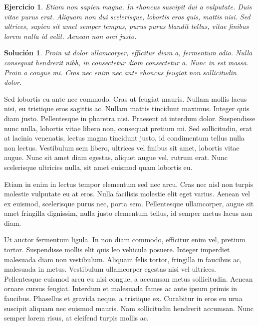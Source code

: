 \documentclass[10pt, a4paper]{article}
\theoremstyle{theorem-style}
\theoremstyle{definition-style}
\theoremstyle{remark-style}
\theoremstyle{example-style}
\theoremstyle{definition-style}
\newtheorem{ejer}{Ejercicio}[section]
\theoremstyle{remark-style}
\newtheorem*{sol}{Solución}
\begin{document}

\begin{ejer}
  Etiam non sapien magna. In rhoncus suscipit dui a vulputate. Duis vitae purus erat. Aliquam non dui scelerisque, lobortis eros quis, mattis nisi. Sed ultrices, sapien sit amet semper tempus, purus purus blandit tellus, vitae finibus lorem nulla id velit. Aenean non orci justo.
\end{ejer}

\begin{sol}
  Proin ut dolor ullamcorper, efficitur diam a, fermentum odio. Nulla consequat hendrerit nibh, in consectetur diam consectetur a. Nunc in est massa. Proin a congue mi. Cras nec enim nec ante rhoncus feugiat non sollicitudin dolor.
\end{sol}

Sed lobortis eu ante nec commodo. Cras ut feugiat mauris. Nullam mollis lacus nisi, eu tristique eros sagittis ac. Nullam mattis tincidunt maximus. Integer quis diam justo. Pellentesque in pharetra nisi. Praesent at interdum dolor. Suspendisse nunc nulla, lobortis vitae libero non, consequat pretium mi. Sed sollicitudin, erat at lacinia venenatis, lectus magna tincidunt justo, id condimentum tellus nulla non lectus. Vestibulum sem libero, ultrices vel finibus sit amet, lobortis vitae augue. Nunc sit amet diam egestas, aliquet augue vel, rutrum erat. Nunc scelerisque ultricies nulla, sit amet euismod quam lobortis eu.

Etiam in enim in lectus tempor elementum sed nec arcu. Cras nec nisl non turpis molestie vulputate eu at eros. Nulla facilisis molestie elit eget varius. Aenean vel ex euismod, scelerisque purus nec, porta sem. Pellentesque ullamcorper, augue sit amet fringilla dignissim, nulla justo elementum tellus, id semper metus lacus non diam.

Ut auctor fermentum ligula. In non diam commodo, efficitur enim vel, pretium tortor. Suspendisse mollis elit quis leo vehicula posuere. Integer imperdiet malesuada diam non vestibulum. Aliquam felis tortor, fringilla in faucibus ac, malesuada in metus. Vestibulum ullamcorper egestas nisi vel ultrices. Pellentesque euismod arcu eu nisi congue, a accumsan metus sollicitudin. Aenean ornare cursus feugiat. Interdum et malesuada fames ac ante ipsum primis in faucibus. Phasellus et gravida neque, a tristique ex. Curabitur in eros eu urna suscipit aliquam nec euismod mauris. Nam sollicitudin hendrerit accumsan. Nunc semper lorem risus, at eleifend turpis mollis ac.
\end{document}
